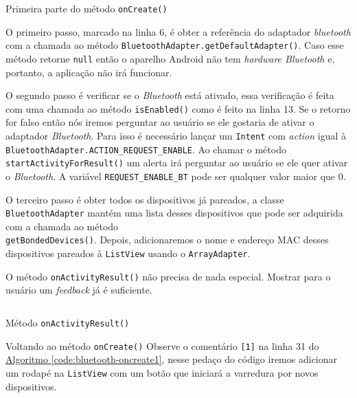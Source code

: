 \documentclass[a4paper,12pt,brazil,oneside]{book}
\begin{document}
	\begin{listing}[H]
	\inputminted[linenos=true,fontsize=\small,frame=lines, framesep=2mm, tabsize=2,numbersep=5pt]{java}{src/api/bluetooth/oncreate1.java}
	\caption{Primeira parte do método \texttt{onCreate()}}
	\label{code:bluetooth-oncreate1}
	\end{listing} 			

	O primeiro passo, marcado na linha 6, é obter a referência do adaptador \emph{bluetooth} com a chamada ao método \texttt{BluetoothAdapter.getDefaultAdapter()}. Caso esse método retorne \texttt{null} então o aparelho Android não tem \emph{hardware Bluetooth} e, portanto, a aplicação não irá funcionar. 

	O segundo passo é verificar se o \emph{Bluetooth} está ativado, essa verificação é feita com uma chamada ao método \texttt{isEnabled()} como é feito na linha 13. Se o retorno for falso então nós iremos perguntar ao usuário se ele gostaria de ativar o adaptador \emph{Bluetooth}. Para isso é necessário lançar um \texttt{Intent} com \emph{action} igual à \texttt{BluetoothAdapter.ACTION\_REQUEST\_ENABLE}. Ao chamar o método \texttt{startActivityForResult()} um alerta irá perguntar ao usuário se ele quer ativar o \emph{Bluetooth}. A variável \texttt{REQUEST\_ENABLE\_BT} pode ser qualquer valor maior que 0.  

	O terceiro passo é obter todos os dispositivos já pareados, a classe \texttt{BluetoothAdapter} mantém uma lista desses dispositivos que pode ser adquirida com a chamada ao método \\ \texttt{getBondedDevices()}. Depois, adicionaremos o nome e endereço MAC desses dispositivos pareados à \texttt{ListView} usando o \texttt{ArrayAdapter}. 

	O método \texttt{onActivityResult()} não precisa de nada especial. Mostrar para o usuário um \emph{feedback} já é suficiente.

	\begin{listing}[H]
	\inputminted[linenos=true,fontsize=\small,frame=lines, framesep=2mm, tabsize=2,numbersep=5pt]{java}{src/api/bluetooth/onactivityresult.java}
	\caption{Método \texttt{onActivityResult()}}
	\label{code:bluetooth-onactivityresult}
	\end{listing} 			

	Voltando ao método \texttt{onCreate()} Observe o comentário \texttt{[1]} na linha 31 do \hyperref[code:bluetooth-oncreate1]{Algoritmo \ref*{code:bluetooth-oncreate1}}, nesse pedaço do código iremos adicionar um rodapé na \texttt{ListView} com um botão que iniciará a varredura por novos dispositivos.
\end{document}
